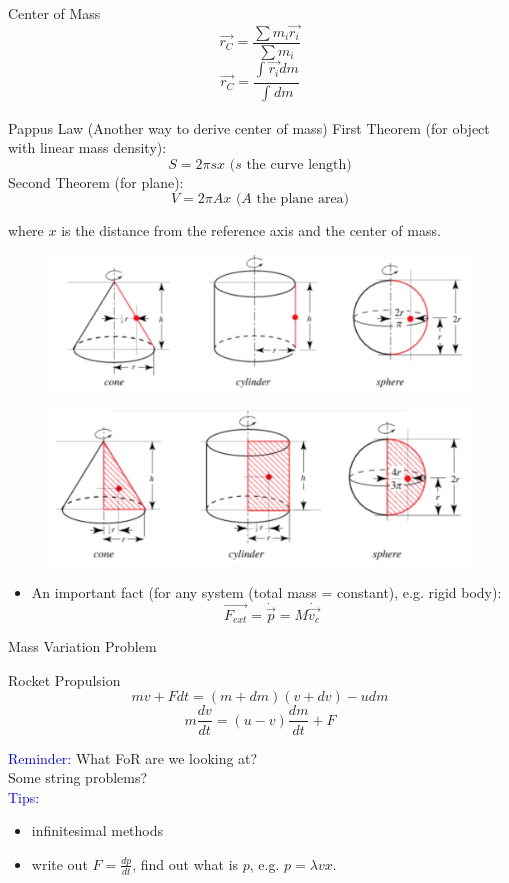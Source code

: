 \documentclass{beamer}
\begin{document}
\begin{frame}
  \begin{block}{Center of Mass}
    $$\vec{r_C} = \frac{\sum m_i\vec{r_i}}{\sum m_i}$$ 
    $$ \vec{r_C} = \frac{\int_{}^{} \vec{r_i} dm}{\int_{}^{} dm}$$
  \end{block}
  \begin{block}{Pappus Law (Another way to derive center of mass)}
    First Theorem (for object with linear mass density): $$S = 2\pi sx\text{ ($s$ the curve length)}$$ 
    Second Theorem (for plane): $$V = 2\pi Ax\text{ ($A$ the plane area)}$$ 
  \end{block}
  where $x$ is the distance from the reference axis and the center of mass.
\end{frame}

\begin{frame}
  \begin{figure}[H]
    \centering
    \includegraphics[width=0.6 \linewidth, angle =0]{example3.png}
    \label{fig:6}
    \end{figure}
    \begin{figure}[htbp]
    \centering
    \includegraphics[width=0.6 \linewidth, angle =0]{example2.png}
    \label{fig:7}
    \end{figure}\pause
    \begin{itemize}
      \item An important fact (for any system (total mass = constant), e.g. rigid body): $$\vec{F_{ext}} =\dot{\vec{p}}= M\dot{\vec{v_c}}$$
    \end{itemize}
\end{frame}
\begin{frame}{Mass Variation Problem}
  \begin{block}{Rocket Propulsion}
    $$mv + Fdt = (m+dm)(v+dv)-udm$$
    $$m\frac{dv}{dt} = (u-v)\frac{dm}{dt}+ F$$
    \end{block}
    \textcolor{blue}{Reminder:}
    What FoR are we looking at?\\
    Some string problems?\\
    \textcolor{blue}{Tips:}\\
    \begin{itemize}
      \item infinitesimal methods
      \item write out $F = \frac{dp}{dt}$, find out what is $p$, e.g. $p = \lambda v x$.
    \end{itemize}
\end{frame}
\end{document}
